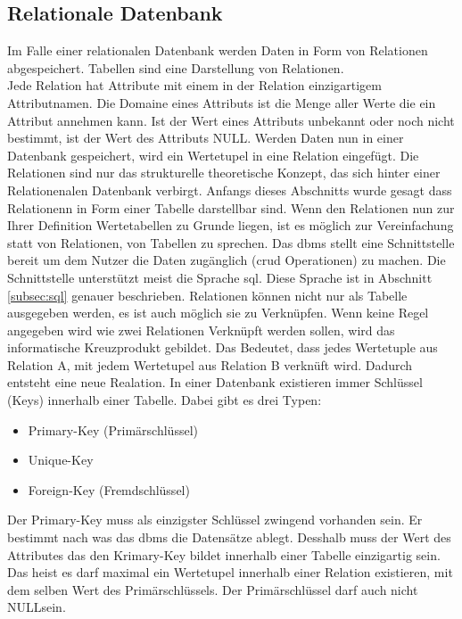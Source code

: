 \subsection{Relationale Datenbank}\label{subsec:relDB}
Im Falle einer relationalen Datenbank werden Daten in Form von Relationen abgespeichert.
Tabellen sind eine Darstellung von Relationen.\\
Jede Relation hat Attribute mit einem in der Relation einzigartigem Attributnamen.
Die Domaine eines Attributs ist die Menge aller Werte die ein Attribut annehmen kann.
Ist der Wert eines Attributs unbekannt oder noch nicht bestimmt, ist der Wert des Attributs \glqq NULL\grqq\citep{Studer:2016:2}.
Werden Daten nun in einer Datenbank gespeichert, wird ein Wertetupel in eine Relation eingefügt.
Die Relationen sind nur das strukturelle theoretische Konzept, das sich hinter einer Relationenalen Datenbank verbirgt.
Anfangs dieses Abschnitts wurde gesagt dass Relationenn in Form einer Tabelle darstellbar sind.
Wenn den Relationen nun zur Ihrer Definition Wertetabellen zu Grunde liegen, 
ist es möglich zur Vereinfachung statt von Relationen, von Tabellen zu sprechen.
Das \ac{dbms} stellt eine Schnittstelle bereit um dem Nutzer die Daten zugänglich (\ac{crud} Operationen) zu machen.
Die Schnittstelle unterstützt meist die Sprache \ac{sql}. Diese Sprache ist in Abschnitt \ref{subsec:sql} genauer beschrieben.
Relationen können nicht nur als Tabelle ausgegeben werden, es ist auch möglich sie zu Verknüpfen.
Wenn keine Regel angegeben wird wie zwei Relationen Verknüpft werden sollen, wird das informatische Kreuzprodukt gebildet.
Das Bedeutet, dass jedes Wertetuple aus Relation A, mit jedem Wertetupel aus Relation B verknüft wird. 
Dadurch entsteht eine neue Realation.
In einer Datenbank existieren immer Schlüssel (Keys) innerhalb einer Tabelle.
Dabei gibt es drei Typen:
\begin{itemize}
  \item Primary-Key (Primärschlüssel)
  \item Unique-Key
  \item Foreign-Key (Fremdschlüssel)
\end{itemize}
Der Primary-Key muss als einzigster Schlüssel zwingend vorhanden sein. Er bestimmt nach was das \ac{dbms} die Datensätze ablegt.
Desshalb muss der Wert des Attributes das den Krimary-Key bildet innerhalb einer Tabelle einzigartig sein.
Das heist es darf maximal ein Wertetupel innerhalb einer Relation existieren, mit dem selben Wert des Primärschlüssels.
Der Primärschlüssel darf auch nicht \glqq NULL\grqq{}sein.
